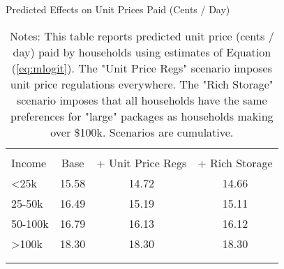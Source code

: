\begin{table}[!htbp] \centering
\caption{Predicted Effects on Unit Prices Paid (Cents / Day)}
\label{tab:counterfactualMNLPrice}
\begin{tabular}{lccc}
\\[-1.8ex]\hline
\hline \\[-1.8ex]
Income   & Base    & + Unit Price Regs   &  + Rich Storage  \\
\hline
<25k     & 15.58   & 14.72              & 14.66 \\
25-50k   & 16.49   & 15.19              & 15.11 \\
50-100k  & 16.79   & 16.13              & 16.12 \\
>100k    & 18.30   & 18.30              & 18.30 \\
\\[-1.8ex]\hline
\hline \\[-1.8ex]
\end{tabular}
\caption*{Notes: This table reports predicted unit price (cents / day) paid by households using estimates of Equation (\ref{eq:mlogit}). The "Unit Price Regs" scenario imposes unit price regulations everywhere. The "Rich Storage" scenario imposes that all households have the same preferences for "large" packages as households making over \$100k. Scenarios are cumulative.}
\end{table}
